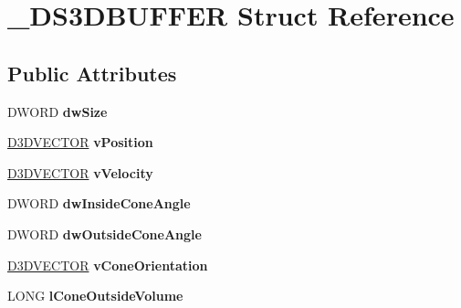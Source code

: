 \hypertarget{struct___d_s3_d_b_u_f_f_e_r}{}\section{\+\_\+\+D\+S3\+D\+B\+U\+F\+F\+ER Struct Reference}
\label{struct___d_s3_d_b_u_f_f_e_r}
\subsection*{Public Attributes}
\begin{DoxyCompactItemize}
\item 
D\+W\+O\+RD {\bfseries dw\+Size}\hypertarget{struct___d_s3_d_b_u_f_f_e_r_a4fa22e228075485d8134c5bda4d907d6}{}\label{struct___d_s3_d_b_u_f_f_e_r_a4fa22e228075485d8134c5bda4d907d6}

\item 
\hyperlink{struct___d3_d_v_e_c_t_o_r}{D3\+D\+V\+E\+C\+T\+OR} {\bfseries v\+Position}\hypertarget{struct___d_s3_d_b_u_f_f_e_r_a6c301c977500deadd609cf5e373ab060}{}\label{struct___d_s3_d_b_u_f_f_e_r_a6c301c977500deadd609cf5e373ab060}

\item 
\hyperlink{struct___d3_d_v_e_c_t_o_r}{D3\+D\+V\+E\+C\+T\+OR} {\bfseries v\+Velocity}\hypertarget{struct___d_s3_d_b_u_f_f_e_r_a94bfe04b47892036cd7494fb71192e57}{}\label{struct___d_s3_d_b_u_f_f_e_r_a94bfe04b47892036cd7494fb71192e57}

\item 
D\+W\+O\+RD {\bfseries dw\+Inside\+Cone\+Angle}\hypertarget{struct___d_s3_d_b_u_f_f_e_r_a1f6c98d823d6b3579430474f6c0d50fb}{}\label{struct___d_s3_d_b_u_f_f_e_r_a1f6c98d823d6b3579430474f6c0d50fb}

\item 
D\+W\+O\+RD {\bfseries dw\+Outside\+Cone\+Angle}\hypertarget{struct___d_s3_d_b_u_f_f_e_r_a3a616b07bc3b150b606c6f29a827d7ad}{}\label{struct___d_s3_d_b_u_f_f_e_r_a3a616b07bc3b150b606c6f29a827d7ad}

\item 
\hyperlink{struct___d3_d_v_e_c_t_o_r}{D3\+D\+V\+E\+C\+T\+OR} {\bfseries v\+Cone\+Orientation}\hypertarget{struct___d_s3_d_b_u_f_f_e_r_a2d6ee0d1c20d2542dce48431bf488b99}{}\label{struct___d_s3_d_b_u_f_f_e_r_a2d6ee0d1c20d2542dce48431bf488b99}

\item 
L\+O\+NG {\bfseries l\+Cone\+Outside\+Volume}\hypertarget{struct___d_s3_d_b_u_f_f_e_r_aa24bf79534683a937688b9926ed58eb1}{}\label{struct___d_s3_d_b_u_f_f_e_r_aa24bf79534683a937688b9926ed58eb1}


\end{DoxyCompactItemize}
